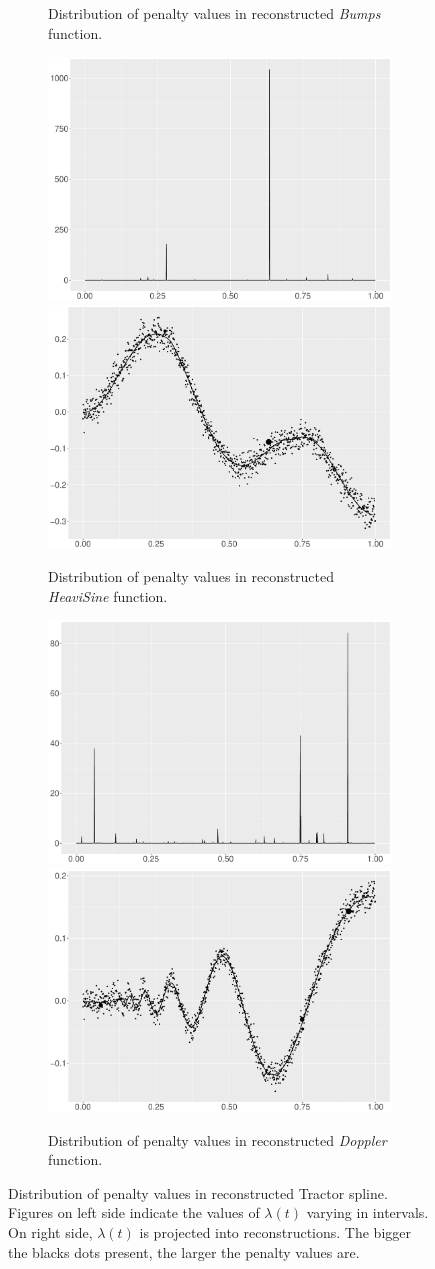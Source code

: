 \begin{figure}
\begin{subfigure}{\textwidth}
    \caption{Distribution of penalty values in reconstructed \textit{Bumps} function.}
    \end{subfigure}
    \begin{subfigure}{\textwidth}
    \centering
    \includegraphics[width=0.45\linewidth]{Chapters/02TractorSplineTheory/plot/ggplot/ggHeaviSinePenaltyBar.pdf}
    \includegraphics[width=0.45\linewidth]{Chapters/02TractorSplineTheory/plot/ggplot/ggHeaviSinePenaltyLine.pdf}
    \caption{Distribution of penalty values in reconstructed \textit{HeaviSine} function.}
    \end{subfigure}
    \begin{subfigure}{\textwidth}
    \centering
    \includegraphics[width=0.45\linewidth]{Chapters/02TractorSplineTheory/plot/ggplot/ggDopplerPenaltyBar.pdf}
    \includegraphics[width=0.45\linewidth]{Chapters/02TractorSplineTheory/plot/ggplot/ggDopplerPenaltyLine.pdf}
    \caption{Distribution of penalty values in reconstructed \textit{Doppler} function.}
    \end{subfigure}
\caption{Distribution of penalty values in reconstructed Tractor spline. Figures on left side indicate the values of $\lambda(t)$ varying in intervals. On right side, $\lambda(t)$ is projected into reconstructions. The bigger the blacks dots present, the larger the penalty values are.}\label{numpenalty}
 \end{figure}



